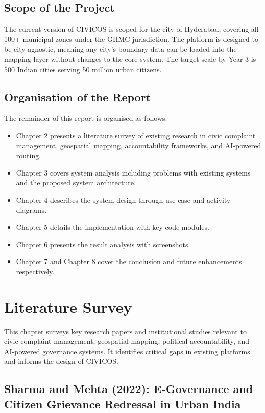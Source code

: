 \documentclass[12pt,a4paper]{report}
\begin{document}
\section{Scope of the Project}

The current version of CIVICOS is scoped for the city of Hyderabad, covering
all 100+ municipal zones under the GHMC jurisdiction. The platform is designed
to be city-agnostic, meaning any city's boundary data can be loaded into the
mapping layer without changes to the core system. The target scale by Year 3 is
500 Indian cities serving 50 million urban citizens.

\section{Organisation of the Report}

The remainder of this report is organised as follows:

\begin{itemize}
    \item Chapter 2 presents a literature survey of existing research in civic
    complaint management, geospatial mapping, accountability frameworks, and
    AI-powered routing.
    \item Chapter 3 covers system analysis including problems with existing
    systems and the proposed system architecture.
    \item Chapter 4 describes the system design through use case and activity
    diagrams.
    \item Chapter 5 details the implementation with key code modules.
    \item Chapter 6 presents the result analysis with screenshots.
    \item Chapter 7 and Chapter 8 cover the conclusion and future enhancements
    respectively.
\end{itemize}

\chapter[LITERATURE SURVEY]{Literature Survey}

This chapter surveys key research papers and institutional studies relevant to civic complaint management, geospatial mapping, political accountability, and AI-powered governance systems. It identifies critical gaps in existing platforms and informs the design of CIVICOS.

\section{Sharma and Mehta (2022): E-Governance and Citizen Grievance Redressal in Urban India}
\end{document}
